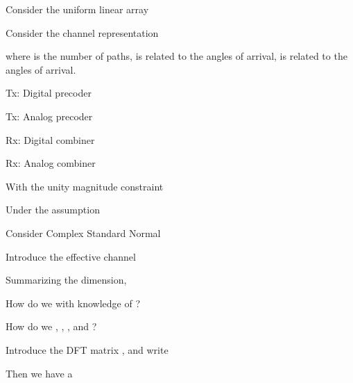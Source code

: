 {
\I Consider the uniform linear array

\I Consider the channel representation

\I where  is the number of paths,  is related to the angles of arrival,  is related to the angles of arrival.
}
{
\I Tx: Digital precoder 

\I Tx: Analog precoder 

\I Rx: Digital combiner 

\I Rx: Analog combiner 

\I With the unity magnitude constraint

\I Under the assumption
}
{
\I Consider Complex Standard Normal 

\I Introduce the effective channel

\I Summarizing the dimension,

\I How do we   with knowledge of ?

\I How do we  , , , and ?
}
{
\I Introduce the DFT matrix , and write

\I Then we have a 
}
